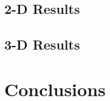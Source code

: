 {{    \subsection{2-D Results}{\label{ssec:Spatial Decomposition:2-D Results}
      \blindtext[8]
    }
    \subsection{3-D Results}{\label{ssec:Spatial Decomposition:3-D Results}
      \blindtext[4]
    }
  }
  \section{Conclusions}{\label{sec:Spatial Decomposition:Conclusions}
    \blindtext[4]
  }
}
